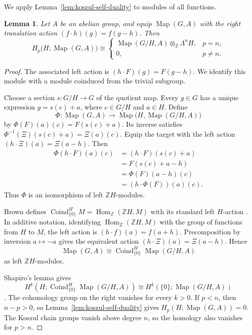 \documentclass[pdflatex,sn-mathphys-num]{sn-jnl}%
\theoremstyle{plain}
\newtheorem{lemma}[theorem]{Lemma}
\theoremstyle{remark}
\theoremstyle{definition}
\numberwithin{equation}{section}
\begin{document}
We apply Lemma~\ref{lem:koszul-self-duality} to modules of all functions.

\begin{lemma}
\label{lem:function-coefficient-homology}
Let \( A \) be an abelian group, and equip \( \operatorname{Map}(G,A) \) with the right translation action \( (f\cdot h)(g)=f(g-h) \). Then
\[
H_p\bigl(H;\operatorname{Map}(G,A)\bigr)
\cong
\begin{cases}
\operatorname{Map}(G/H,A)\otimes_{\mathbb Z}\Lambda^nH,
& p=n,\\
0,
& p\neq n.
\end{cases}
\]
\end{lemma}

\begin{proof}
The associated left action is \( (h\cdot F)(g)=F(g-h) \). We identify this module with a module coinduced from the trivial subgroup.

Choose a section \( s\colon G/H\to G \) of the quotient map. Every \( g\in G \) has a unique expression \( g=s(c)+a \), where \( c\in G/H \) and \( a\in H \). Define
\[
\Phi\colon
\operatorname{Map}(G,A)
\longrightarrow
\operatorname{Map}\bigl(H,\operatorname{Map}(G/H,A)\bigr)
\]
by \( \Phi(F)(a)(c)=F(s(c)+a) \). Its inverse satisfies \( \Phi^{-1}(\Xi)(s(c)+a)=\Xi(a)(c) \). Equip the target with the left action \( (h\cdot\Xi)(a)=\Xi(a-h) \). Then
\[
\begin{aligned}
\Phi(h\cdot F)(a)(c)
&=
(h\cdot F)(s(c)+a)\\
&=
F(s(c)+a-h)\\
&=
\Phi(F)(a-h)(c)\\
&=
(h\cdot\Phi(F))(a)(c).
\end{aligned}
\]
Thus \( \Phi \) is an isomorphism of left \( \mathbb ZH \)-modules.

Brown defines \( \operatorname{Coind}_{\{0\}}^H M =\operatorname{Hom}_{\mathbb Z}(\mathbb ZH,M) \) with its standard left \( H \)-action \cite[Chapter~III, Section~5]{brown2012cohomology}. In additive notation, identifying \( \operatorname{Hom}_{\mathbb Z}(\mathbb ZH,M) \) with the group of functions from \( H \) to \( M \), the left action is \( (h\cdot f)(a)=f(a+h) \). Precomposition by inversion \( a\mapsto-a \) gives the equivalent action \( (h\cdot\Xi)(a)=\Xi(a-h) \). Hence
\[
\operatorname{Map}(G,A)
\cong
\operatorname{Coind}_{\{0\}}^H
\operatorname{Map}(G/H,A)
\]
as left \( \mathbb ZH \)-modules.

Shapiro's lemma gives
\[
H^k\left(
H;
\operatorname{Coind}_{\{0\}}^H
\operatorname{Map}(G/H,A)
\right)
\cong
H^k\left(
\{0\};
\operatorname{Map}(G/H,A)
\right)
\]
\cite[Proposition~III.6.2]{brown2012cohomology}. The cohomology group on the right vanishes for every \( k>0 \). If \( p<n \), then \( n-p>0 \), so Lemma~\ref{lem:koszul-self-duality} gives \( H_p(H;\operatorname{Map}(G,A))=0 \). The Koszul chain groups vanish above degree \( n \), so the homology also vanishes for \( p>n \).


\end{proof}
\end{document}
